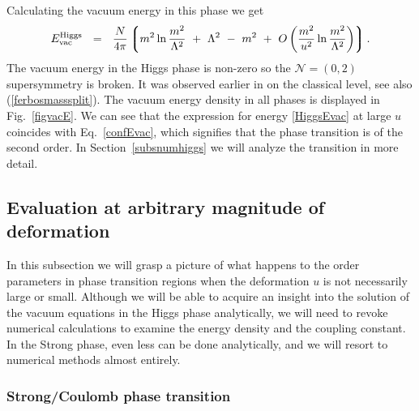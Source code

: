 \documentclass[epsfig,12pt]{article}
\def\beq{\begin{equation}}
\def\eeq{\end{equation}}
\def\beq{\begin{equation}}
\def\eeq{\end{equation}}
\newcommand{\ntwoo}{${\mathcal N}= \left(0,2\right) $ }
\newcommand{\lgr}{\left\lgroup}
\newcommand{\rgr}{\right\rgroup}
\begin{document}
{Calculating the vacuum energy in this phase we get
\beq
E_{\rm vac}^{\rm Higgs} ~~=~~ \frac{N}{4\pi}\lgr m^2\ln {\frac{m^2}{\Lambda^2}} ~+~ \Lambda^2 ~-~ m^2 
                                                         ~+~ O \left( \frac{m^2}{u^2} \ln \frac{m^2}{\Lambda^2} \right)
					\rgr.
\label{HiggsEvac}
\eeq
The vacuum energy in the Higgs phase is non-zero so the \ntwoo supersymmetry is broken. It was 
observed earlier in \cite{BSY3} on the classical level, see also (\ref{ferbosmasssplit}).
The vacuum energy density in all phases is displayed in Fig.~\ref{figvacE}. 
We can see that the expression for energy \eqref{HiggsEvac} at large $u$ coincides with Eq.~\eqref{confEvac},
which signifies that the phase transition is of the second order.
In Section~\ref{subsnumhiggs} we will analyze the transition in more detail.

%
%
\subsection{Evaluation at arbitrary magnitude of deformation} 
\label{subsnum}

In this subsection we will grasp a picture of what happens to the order parameters in phase 
transition regions when the deformation $ u $ is not necessarily large or small.
Although we will be able to acquire an insight into the solution of the vacuum equations
in the Higgs phase analytically, we will need to revoke numerical calculations to 
examine the energy density and the coupling constant. 
In the Strong phase, even less can be done analytically, and we will resort to numerical
methods almost entirely. 

\subsubsection{Strong/Coulomb phase transition}
\label{subsnumstrong}

}
\end{document}
